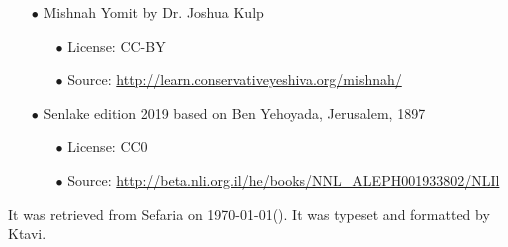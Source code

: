 \documentclass[12pt, openany]{book}
\newcommand{\partname}[1]{}
\newcommand{\sethebfont}{
\fontsize{10.5pt}{13.1pt} \selectfont
}
\newcommand{\twocol}[1]{
	{\sethebfont \begin{multicols}{2}
			#1
	\end{multicols}}	
}
\newcommand{\chapname}{}
\begin{document}
\begin{minipage}[b][\textheight][b]{\textwidth}
\begin{english}
\begin{itemize}
\begin{itemize}
\end{itemize}
\item[$\bullet$] Mishnah Yomit by Dr. Joshua Kulp
\begin{itemize}
\item[$\bullet$] License: CC-BY
\item[$\bullet$] Source: \url{http://learn.conservativeyeshiva.org/mishnah/}
\end{itemize}
\item[$\bullet$] Senlake edition 2019 based on Ben Yehoyada, Jerusalem, 1897
\begin{itemize}
\item[$\bullet$] License: CC0
\item[$\bullet$] Source: \url{http://beta.nli.org.il/he/books/NNL_ALEPH001933802/NLIl}
\end{itemize}
\end{itemize}
		It was retrieved from Sefaria on \today\space \texthebrew{(\Hebrewtoday)}.  It was typeset and formatted by Ktavi.
		\clearpage
		
	\end{english}
\end{minipage}

\titlelabel{\thetitle\quad}
{\small \tableofcontents}


\clearpage
\mainmatter
{}

\renewcommand{\partname}[1]{אסתר}
\fancyhead[CO]{\chapname}
\fancyhead[CE]{\partname}
\twocol{\clearpage}
\end{document}
